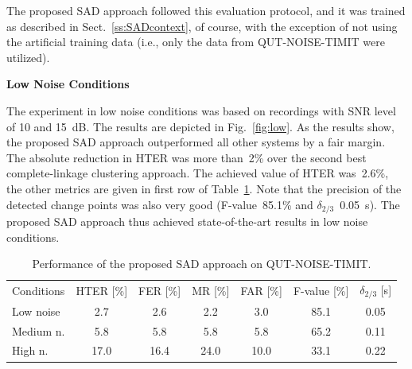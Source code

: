 \documentclass[FM,noheader,EN,bwtitles]{tulthesis}
\begin{document}
The proposed SAD approach followed this evaluation protocol, and it was trained as described in Sect.~\ref{ss:SADcontext}, of course, with the exception of not using the artificial training data (i.e., only the data from QUT-NOISE-TIMIT were utilized).

\bigskip
\noindent
\textbf{Low Noise Conditions}
\medskip

\noindent
The experiment in low noise conditions was based on recordings with SNR level of 10 and 15~dB.
The results are depicted in Fig.~\ref{fig:low}.
As the results show, the proposed SAD approach outperformed all other systems by a fair margin.
The absolute reduction in HTER was more than~2\% over the second best complete-linkage clustering approach.
The achieved value of HTER was~2.6\%, the other metrics are given in first row of Table~\ref{table:qut}.
Note that the precision of the detected change points was also very good (F-value~85.1\% and $\delta_{2/3}$~0.05~s).
The proposed SAD approach thus achieved state-of-the-art results in low noise conditions.

\begin{table}
\caption{Performance of the proposed SAD approach on QUT-NOISE-TIMIT.}
\label{table:qut}
\centering
\begin{tabular}{lcccccc}
\hline
\noalign{\smallskip}
Conditions & HTER [\%] & FER [\%] & MR [\%] & FAR [\%] & F-value [\%] & $\delta_{2/3}$ [s] \\
\noalign{\smallskip}
\hline
\noalign{\smallskip}
Low noise & 2.7 & 2.6 & 2.2 & 3.0 & 85.1 & 0.05 \\
Medium n. & 5.8 & 5.8 & 5.8 & 5.8 & 65.2 & 0.11 \\
High n. & 17.0 & 16.4 & 24.0 & 10.0 & 33.1 & 0.22 \\
\hline
\end{tabular}
\end{table}

\end{document}
